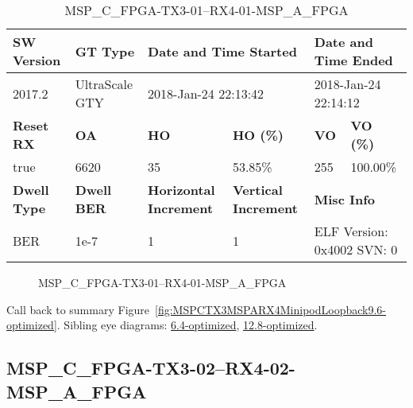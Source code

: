 \begin{table}[h]
\centering
\caption{MSP\_C\_FPGA-TX3-01--RX4-01-MSP\_A\_FPGA}
\label{tab:MSPCFPGATX301RX401MSPAFPGA9.6-optimized}
\begin{tabular}{@{}|l|l|l|l|l|l|@{}}
\toprule
\textbf{SW Version}                & \textbf{GT Type}   & \multicolumn{2}{l|}{\textbf{Date and Time Started}}            & \multicolumn{2}{l|}{\textbf{Date and Time Ended}}        \\ \midrule
2017.2                       & UltraScale GTY          & \multicolumn{2}{l|}{2018-Jan-24 22:13:42}                   & \multicolumn{2}{l|}{2018-Jan-24 22:14:12}               \\ \midrule
\textbf{Reset RX}                  & \textbf{OA} & \textbf{HO}   & \textbf{HO (\%)} & \textbf{VO} & \textbf{VO (\%)} \\ \midrule
true & 6620        & 35          & 53.85\%        & 255        & 100.00\%       \\ \midrule
\textbf{Dwell Type}                & \textbf{Dwell BER} & \textbf{Horizontal Increment} & \textbf{Vertical Increment}    & \multicolumn{2}{l|}{\textbf{Misc Info}}                  \\ \midrule
BER                            & 1e-7        & 1        & 1           & \multicolumn{2}{l|}{ELF Version: 0x4002 SVN: 0}                         \\ \bottomrule
\end{tabular}
\end{table}

\begin{figure}[h]
\caption{MSP\_C\_FPGA-TX3-01--RX4-01-MSP\_A\_FPGA} \label{fig:MSPCFPGATX301RX401MSPAFPGA9.6-optimized}
\end{figure}

Call back to summary Figure~\ref{fig:MSPCTX3MSPARX4MinipodLoopback9.6-optimized}.
Sibling eye diagrams: \hyperref[sec:MSPCFPGATX301RX401MSPAFPGA6.4-optimized]{6.4-optimized}, \hyperref[sec:MSPCFPGATX301RX401MSPAFPGA12.8-optimized]{12.8-optimized}.

\clearpage
\newpage


\subsection{MSP\_C\_FPGA-TX3-02--RX4-02-MSP\_A\_FPGA}\label{sec:MSPCFPGATX302RX402MSPAFPGA9.6-optimized}

